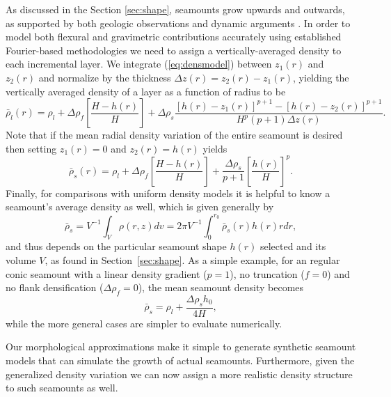 As discussed in the Section \ref{sec:shape}, seamounts grow upwards and outwards, as supported by both
geologic observations \citep[e.g.,~][]{SC2010} and dynamic arguments \citep[e.g.,~][]{LOT81}. In order to
model both flexural and gravimetric contributions accurately using established Fourier-based methodologies
\citep[e.g.,~][]{P1972,WattsBook} we need to assign a vertically-averaged density to each incremental
layer.  We integrate (\ref{eq:densmodel}) between $z_1(r)$ and $z_2(r)$ and normalize by the thickness
$\Delta z(r) = z_2(r) - z_1(r)$, yielding the vertically averaged density of a layer as a function of
radius to be
\begin{equation}
\bar{\rho}_l(r) = \rho_l + \Delta \rho_f \left [\frac{H-h(r)}{H}\right ] + \Delta \rho_s \frac{\left [h(r) - z_1(r) \right ]^{p+1} - \left [ h(r) - z_2(r) \right ]^{p+1}}{H^p (p+1)\Delta z(r)}.
\label{eq:avedenslayer}
\end{equation}
Note that if the mean radial density variation of the entire seamount is desired then setting $z_1(r) = 0$
and $z_2(r) = h(r)$ yields
\begin{equation}
\bar{\rho}_s(r) = \rho_l + \Delta \rho_f \left [\frac{H-h(r)}{H}\right ] + \frac{\Delta \rho_s}{p+1} \left [ \frac{h(r)}{H} \right ]^p.
\label{eq:avedenssmt}
\end{equation}
Finally, for comparisons with uniform density models it is helpful to know a seamount's average density as well,
which is given generally by
\begin{equation*}
\bar{\rho}_s = V^{-1}\int_V \rho(r,z)dv = 2 \pi V^{-1} \int_0^{r_0} \bar{\rho}_s(r) h(r) r dr,
\end{equation*}
and thus depends on the particular seamount shape $h(r)$ selected and its volume $V$, as found in
Section~\ref{sec:shape}. As a simple example, for an regular conic seamount with a linear density gradient
($p = 1$), no truncation ($f = 0$) and no flank densification ($\Delta \rho_f = 0$), the mean seamount density becomes
\begin{equation*}
\bar{\rho}_s = \rho_l + \frac{\Delta \rho_s h_0}{4 H},
\end{equation*}
while the more general cases are simpler to evaluate numerically.

Our morphological approximations make it simple to generate synthetic seamount models that can simulate the
growth of actual seamounts.  Furthermore, given the generalized density variation we can now assign a more realistic
density structure to such seamounts as well.  

